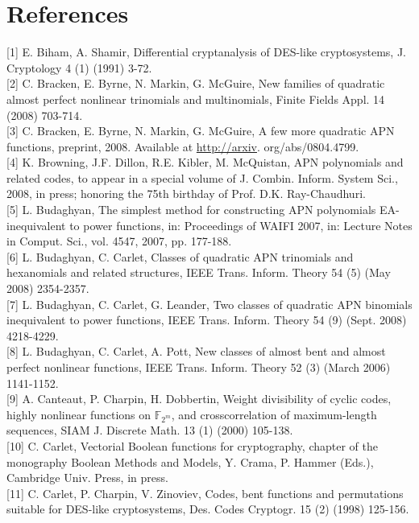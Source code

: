 \documentclass[10pt]{article}
\begin{document}
\section*{References}
[1] E. Biham, A. Shamir, Differential cryptanalysis of DES-like cryptosystems, J. Cryptology 4 (1) (1991) 3-72.\\[0pt]
[2] C. Bracken, E. Byrne, N. Markin, G. McGuire, New families of quadratic almost perfect nonlinear trinomials and multinomials, Finite Fields Appl. 14 (2008) 703-714.\\[0pt]
[3] C. Bracken, E. Byrne, N. Markin, G. McGuire, A few more quadratic APN functions, preprint, 2008. Available at \href{http://arxiv}{http://arxiv}. org/abs/0804.4799.\\[0pt]
[4] K. Browning, J.F. Dillon, R.E. Kibler, M. McQuistan, APN polynomials and related codes, to appear in a special volume of J. Combin. Inform. System Sci., 2008, in press; honoring the 75th birthday of Prof. D.K. Ray-Chaudhuri.\\[0pt]
[5] L. Budaghyan, The simplest method for constructing APN polynomials EA-inequivalent to power functions, in: Proceedings of WAIFI 2007, in: Lecture Notes in Comput. Sci., vol. 4547, 2007, pp. 177-188.\\[0pt]
[6] L. Budaghyan, C. Carlet, Classes of quadratic APN trinomials and hexanomials and related structures, IEEE Trans. Inform. Theory 54 (5) (May 2008) 2354-2357.\\[0pt]
[7] L. Budaghyan, C. Carlet, G. Leander, Two classes of quadratic APN binomials inequivalent to power functions, IEEE Trans. Inform. Theory 54 (9) (Sept. 2008) 4218-4229.\\[0pt]
[8] L. Budaghyan, C. Carlet, A. Pott, New classes of almost bent and almost perfect nonlinear functions, IEEE Trans. Inform. Theory 52 (3) (March 2006) 1141-1152.\\[0pt]
[9] A. Canteaut, P. Charpin, H. Dobbertin, Weight divisibility of cyclic codes, highly nonlinear functions on $\mathbb{F}_{2^{m}}$, and crosscorrelation of maximum-length sequences, SIAM J. Discrete Math. 13 (1) (2000) 105-138.\\[0pt]
[10] C. Carlet, Vectorial Boolean functions for cryptography, chapter of the monography Boolean Methods and Models, Y. Crama, P. Hammer (Eds.), Cambridge Univ. Press, in press.\\[0pt]
[11] C. Carlet, P. Charpin, V. Zinoviev, Codes, bent functions and permutations suitable for DES-like cryptosystems, Des. Codes Cryptogr. 15 (2) (1998) 125-156.\\[0pt]
\end{document}
